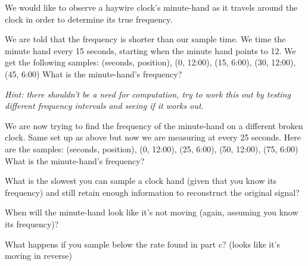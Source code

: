 


We would like to observe a haywire clock’s minute-hand as it travels around the clock in order to determine its true frequency.


\begin{enumerate}
\qitem We are told that the frequency is shorter than our sample time. We time the minute hand every 15 seconds, starting when the minute hand points to 12. We get the following samples:
(seconds, position), (0, 12:00), (15, 6:00), (30, 12:00), (45, 6:00) 
What is the minute-hand’s frequency?

\textit{Hint: there shouldn’t be a need for computation, try to work this out by testing different frequency intervals and seeing if it works out.}


\qitem We are now trying to find the frequency of the minute-hand on a different broken clock. Same set up as above but now we are measuring at every 25 seconds. Here are the samples:
(seconds, position), (0, 12:00), (25, 6:00), (50, 12:00), (75, 6:00)
What is the minute-hand’s frequency?


\qitem What is the slowest you can sample a clock hand (given that you know its frequency) and still retain enough information to reconstruct the original signal?


\qitem When will the minute-hand look like it’s not moving (again, assuming you know its frequency)?


\qitem What happens if you sample below the rate found in part c? (looks like it’s moving in reverse)


\end{enumerate}

